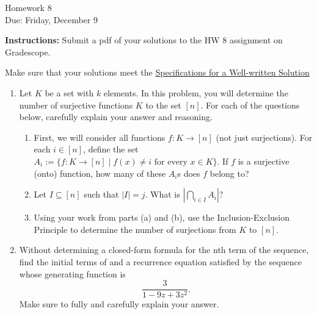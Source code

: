 \documentclass[12pt]{article}
\begin{document}
\begin{center}
{\Large Homework 8}\\
Due: Friday, December 9\\
\end{center}
{\bf Instructions:} Submit a pdf of your solutions to the HW 8 assignment on Gradescope. 

Make sure that your solutions meet the \href{https://docs.google.com/document/d/18LfQoqi6BsY2VdAlpC5xdYEA2rxSGoH0891nVec4_Os/edit?usp=sharing}{Specifications for a Well-written Solution} 

\begin{enumerate}
\item Let $K$ be a set with $k$ elements. In this problem, you will determine the number of surjective functions $K$ to the set $[n]$.  For each of the questions below, carefully explain your answer and reasoning. 
\begin{enumerate}
\item First, we will consider all functions $f:K\to [n]$ (not just surjections). For each $i\in [n]$, define the set $A_i:=\{f:K\to [n]\mid f(x)\ne i \text{ for every } x\in K\}$.  If $f$ is a surjective (onto) function, how many of these $A_i$s does $f$ belong to? 
\item Let $I\subseteq [n]$ such that $|I|=j$. What is $|\bigcap_{i\in I} A_i|$?
\item Using your work from parts (a) and (b), use the Inclusion-Exclusion Principle to determine the number of surjections from $K$ to $[n]$. 
\end{enumerate} 

\item Without determining a closed-form formula for the nth term of the sequence, find the initial terms of and a recurrence equation satisfied by the sequence whose generating function is 
$$\frac{3}{1-9z+3z^2}.$$ Make sure to fully and carefully explain your answer. 

\end{enumerate}
\end{document}
